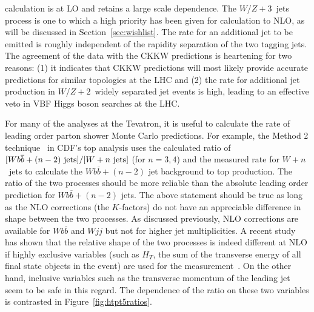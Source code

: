 \documentclass[12pt]{iopart}
\begin{document}
calculation is at LO and retains a large scale dependence. The $W$/$Z + 3$~jets process is one to which a high priority has been given for
calculation to NLO, as will be discussed in Section~\ref{sec:wishlist}. The rate for an additional jet to be emitted is roughly
independent of the rapidity separation of the two tagging jets.
The agreement of the  data  with the CKKW predictions is heartening for two reasons: (1) it indicates that CKKW  predictions will most
likely provide accurate predictions for similar topologies at the LHC and (2) the rate for additional jet production in
$W$/$Z + 2$~widely separated jet events is high, leading to an effective veto in VBF Higgs boson searches at the LHC. 

For many of the analyses at the Tevatron, it is useful to calculate the rate of leading order parton shower Monte Carlo predictions.
For example, the Method 2 technique~\cite{Acosta:2004hw} in CDF's top analysis uses the calculated ratio of
$[Wb\overline{b}+(n-2)~{\rm jets}]/[W+n~{\rm jets}]$ (for $n=3,4$)
and the measured rate for $W +  n$~jets to calculate the $Wb\overline{b}+(n-2)$ jet background to top production. The ratio of the two
processes should be more reliable than the absolute  leading order prediction for  $Wb\overline{b}+(n-2)$ jets. The above statement
should be true as long as the NLO corrections (the $K$-factors) do not have an appreciable difference in shape between the two processes.
As discussed previously, NLO corrections are available for $Wb\overline{b}$ and $Wjj$ but not for higher jet multiplicities. A recent
study has shown that the relative shape of the two processes is indeed different at NLO if highly exclusive variables (such as $H_T$,
the sum of the transverse energy of all final state objects in the event) are used for the measurement~\cite{Campbell:2004sp}.
On the other hand, inclusive variables such as the transverse momentum of the leading jet seem to be safe in
this regard. The dependence of the ratio on these two variables is contrasted in Figure~\ref{fig:htpt5ratios}.
\end{document}
